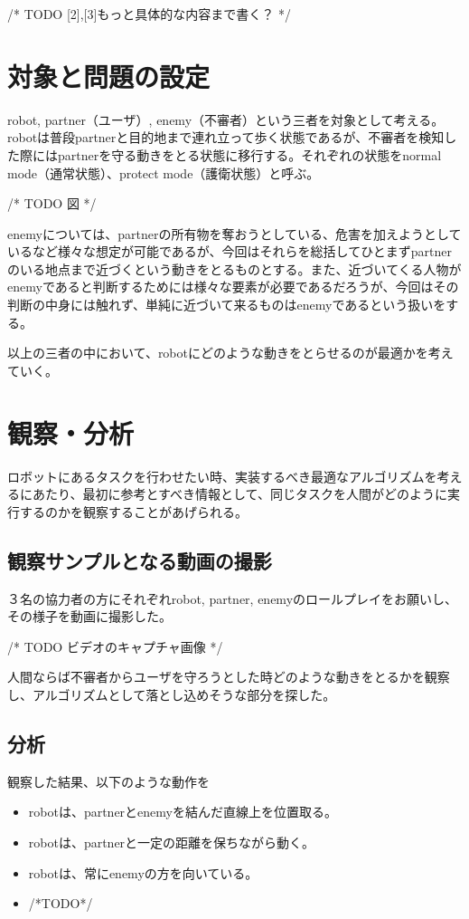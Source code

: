 \documentclass[12pt,titlepage]{jsarticle}
\begin{document}
/* TODO [2],[3]もっと具体的な内容まで書く？ */

\section{対象と問題の設定}
robot, partner（ユーザ）, enemy（不審者）という三者を対象として考える。robotは普段partnerと目的地まで連れ立って歩く状態であるが、不審者を検知した際にはpartnerを守る動きをとる状態に移行する。それぞれの状態をnormal mode（通常状態）、protect mode（護衛状態）と呼ぶ。

/* TODO 図 */

enemyについては、partnerの所有物を奪おうとしている、危害を加えようとしているなど様々な想定が可能であるが、今回はそれらを総括してひとまずpartnerのいる地点まで近づくという動きをとるものとする。また、近づいてくる人物がenemyであると判断するためには様々な要素が必要であるだろうが、今回はその判断の中身には触れず、単純に近づいて来るものはenemyであるという扱いをする。

以上の三者の中において、robotにどのような動きをとらせるのが最適かを考えていく。


\section{観察・分析}
ロボットにあるタスクを行わせたい時、実装するべき最適なアルゴリズムを考えるにあたり、最初に参考とすべき情報として、同じタスクを人間がどのように実行するのかを観察することがあげられる。

\subsection{観察サンプルとなる動画の撮影}

３名の協力者の方にそれぞれrobot, partner, enemyのロールプレイをお願いし、その様子を動画に撮影した。

/* TODO ビデオのキャプチャ画像 */

人間ならば不審者からユーザを守ろうとした時どのような動きをとるかを観察し、アルゴリズムとして落とし込めそうな部分を探した。

\subsection{分析}

観察した結果、以下のような動作を

\begin{itemize}
\item robotは、partnerとenemyを結んだ直線上を位置取る。
\item robotは、partnerと一定の距離を保ちながら動く。
\item robotは、常にenemyの方を向いている。
\item /*TODO*/
\end{itemize}
\end{document}
